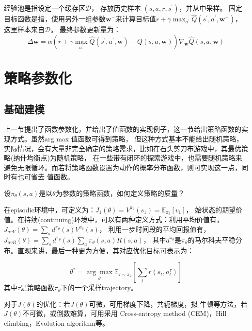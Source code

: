 \documentclass[UTF8]{ctexart}
\begin{document}
经验池是指设定一个缓存区$\mathcal{D}$， 存放历史样本
$\left(s, a, r, s^{\prime}\right)$，并从中采样。
固定目标函数是指，使用另外一组参数$\mathbf{w}^{-}$来计算目标值$r+\gamma \max _{a^{\prime}} \hat{Q}(s^{\prime}, a^{\prime}, \mathbf{w}^{-})$，
这里样本来自$\mathcal{D}$。
最终参数更新量为：
\begin{equation}
    \Delta \mathbf{w}=\alpha\left(r+\gamma \max _{a^{\prime}} \hat{Q}\left(s^{\prime}, a^{\prime}, \mathbf{w}\right)-
Q(s, a, \mathbf{w})\right) \nabla_{\mathbf{w}} \hat{Q}(s, a, \mathbf{w})
\end{equation}

\section{策略参数化}
\subsection{基础建模}
\label{sec:PGD}
上一节提出了函数参数化，并给出了值函数的实现例子，这一节给出策略函数的实现方式。虽然arg max 值函数可得到策略，
但这种方式基本不能给出随机策略，实际情况，会有大量非完全确定的策略需求，比如在石头剪刀布游戏中，其最优策略(纳什均衡点)为随机策略，
在一些带有闭环的探索游戏中，也需要随机策略来避免无限循环。而若将策略函数设置为动作的概率分布函数，则可实现这一点，同时有也可省去
值函数。

设$\pi_{\theta}(s, a)$是以$\theta$为参数的策略函数，如何定义策略的质量？

在episodic环境中，可定义为：$J_{1}(\theta)=V^{\pi_{\theta}}(s_1)=\mathbb{E}_{\pi_{\theta}}[v_1]$，
始状态的期望价值。在持续(continuing)环境中，可以有两种定义方式：利用平均价值有，$J_{avV}(\theta)=\sum_{s}d^{\pi_{\theta}}(s)V^{\pi_{\theta}}(s)$，
利用一步时间段的平均回报值有，$J_{avR}(\theta)=\sum_{s}d^{\pi_{\theta}}(s)\sum_{a}\pi_{\theta}(s,a)R(s,a)$，
其中$d^{\pi_{\theta}}$是$\pi_{\theta}$的马尔科夫平稳分布。直观来讲，最后一种更为方便，其对应优化目标可表示为：

\begin{equation}\theta^{*}=\underset{\theta}{\arg \max } \mathbb{E}_{\tau \sim \pi_{\theta}}
\left[\sum_{t} r\left(s_{t}, a_{t}^{\tau}\right)\right]\end{equation}
其中$\tau$是策略函数$\pi_{\theta}$下的一个采样trajectory。

对于$J(\theta)$的优化：若$J(\theta)$可微，可用梯度下降，共轭梯度，拟-牛顿等方法，若$J(\theta)$不可微，或倒数难算，可用采用
Cross-entropy method (CEM)，Hill climbing，Evolution algorithm等。
\end{document}
